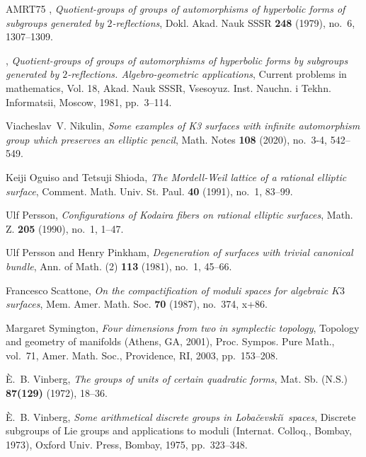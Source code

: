 \documentclass{amsart}
\begin{document}
\begin{thebibliography}{AMRT75}
\bysame, \emph{Quotient-groups of groups of automorphisms of hyperbolic forms
  of subgroups generated by {$2$}-reflections}, Dokl. Akad. Nauk SSSR
  \textbf{248} (1979), no.~6, 1307--1309. 

\bysame, \emph{Quotient-groups of groups of automorphisms of hyperbolic forms
  by subgroups generated by {$2$}-reflections. {A}lgebro-geometric
  applications}, Current problems in mathematics, {V}ol. 18, Akad. Nauk SSSR,
  Vsesoyuz. Inst. Nauchn. i Tekhn. Informatsii, Moscow, 1981, pp.~3--114.

Viacheslav~V. Nikulin, \emph{Some examples of {K}3 surfaces with infinite
  automorphism group which preserves an elliptic pencil}, Math. Notes
  \textbf{108} (2020), no.~3-4, 542--549. 

Keiji Oguiso and Tetsuji Shioda, \emph{The {M}ordell-{W}eil lattice of a
  rational elliptic surface}, Comment. Math. Univ. St. Paul. \textbf{40}
  (1991), no.~1, 83--99. 

Ulf Persson, \emph{Configurations of {K}odaira fibers on rational elliptic
  surfaces}, Math. Z. \textbf{205} (1990), no.~1, 1--47. 

Ulf Persson and Henry Pinkham, \emph{Degeneration of surfaces with trivial
  canonical bundle}, Ann. of Math. (2) \textbf{113} (1981), no.~1, 45--66.

Francesco Scattone, \emph{On the compactification of moduli spaces for
  algebraic {$K3$} surfaces}, Mem. Amer. Math. Soc. \textbf{70} (1987),
  no.~374, x+86. 

Margaret Symington, \emph{Four dimensions from two in symplectic topology},
  Topology and geometry of manifolds ({A}thens, {GA}, 2001), Proc. Sympos. Pure
  Math., vol.~71, Amer. Math. Soc., Providence, RI, 2003, pp.~153--208.

\`E.~B. Vinberg, \emph{The groups of units of certain quadratic forms}, Mat.
  Sb. (N.S.) \textbf{87(129)} (1972), 18--36. 

{\`E}.~B. Vinberg, \emph{Some arithmetical discrete groups in {L}oba\v
  cevski\u\i\ spaces}, Discrete subgroups of {L}ie groups and applications to
  moduli ({I}nternat. {C}olloq., {B}ombay, 1973), Oxford Univ. Press, Bombay,
  1975, pp.~323--348. 


\end{thebibliography}
\end{document}

